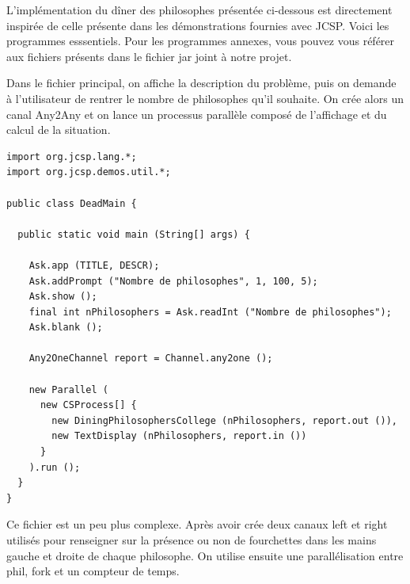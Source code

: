 \documentclass[a4paper,11pt,french]{report}
\begin{document}
L'implémentation du dîner des philosophes présentée ci-dessous est directement inspirée de celle présente dans les démonstrations fournies avec JCSP. Voici les programmes esssentiels. Pour les programmes annexes, vous pouvez vous référer aux fichiers présents dans le fichier jar joint à notre projet.

Dans le fichier principal, on affiche la description du problème, puis on demande à l'utilisateur de rentrer le nombre de philosophes qu'il souhaite. On crée alors un canal Any2Any et on lance un processus parallèle composé de l'affichage et du calcul de la situation.

\begin{lstlisting}[frame=trBL,title={Dîner des philosophes : DeadMain.java}]
import org.jcsp.lang.*;
import org.jcsp.demos.util.*;

public class DeadMain {

  public static void main (String[] args) {

  	Ask.app (TITLE, DESCR);
  	Ask.addPrompt ("Nombre de philosophes", 1, 100, 5);
  	Ask.show ();
  	final int nPhilosophers = Ask.readInt ("Nombre de philosophes");
  	Ask.blank ();

    Any2OneChannel report = Channel.any2one ();

    new Parallel (
      new CSProcess[] {
        new DiningPhilosophersCollege (nPhilosophers, report.out ()),
        new TextDisplay (nPhilosophers, report.in ())
      }
    ).run ();
  }
}
\end{lstlisting}

Ce fichier est un peu plus complexe. Après avoir crée deux canaux left et right utilisés pour renseigner sur la présence ou non de fourchettes dans les mains gauche et droite de chaque philosophe. On utilise ensuite une parallélisation entre phil, fork et un compteur de temps.
\end{document}
